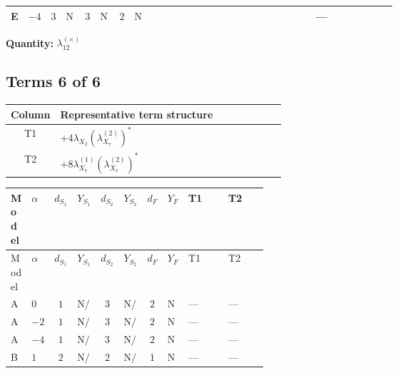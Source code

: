 \documentclass[8pt]{article}
\begin{document}
\begin{landscape}
\begin{longtable}{@{}llcccccc >{\raggedright\arraybackslash}p{0.21\linewidth} >{\raggedright\arraybackslash}p{0.21\linewidth} >{\raggedright\arraybackslash}p{0.21\linewidth}@{}}
\midrule
E & $-4$ & $3$ & $\text{N/A}$ & $3$ & $\text{N/A}$ & $2$ & $\text{N/A}$ & \scriptsize\adjustbox{max width=\linewidth}{$\begin{gathered} +2 {\lambda_{12}^{(\times)}} {\lambda_{S_2}^{(1)}}\end{gathered}$} & \scriptsize\adjustbox{max width=\linewidth}{$\begin{gathered} -2 {\lambda_{12}^{(\times)}} {\lambda_{S_2}^{(A)}}\end{gathered}$} & --- \\
\midrule
\bottomrule
\end{longtable}
\clearpage
\noindent\textbf{Quantity: }$\lambda_{12}^{(\times)}$\par\smallskip
\subsection*{Terms 6 of 6}
\begin{center}
\begin{tabular}{@{}c >{\raggedright\arraybackslash}p{0.82\linewidth}@{}}
\toprule
Column & Representative term structure \\
\midrule
T1 & \(\displaystyle +4 {\lambda_{X_{2}}} \left({\lambda_{X_{7}}^{(2)}}\right)^{*}\) \\
\midrule
T2 & \(\displaystyle +8 {\lambda_{X_{7}}^{(1)}} \left({\lambda_{X_{7}}^{(2)}}\right)^{*}\) \\
\midrule
\bottomrule
\end{tabular}
\end{center}
\smallskip
\tiny
\begin{longtable}{@{}llcccccc >{\raggedright\arraybackslash}p{0.21\linewidth} >{\raggedright\arraybackslash}p{0.21\linewidth}@{}}
\toprule
Model & $\alpha$ & $d_{S_1}$ & $Y_{S_1}$ & $d_{S_2}$ & $Y_{S_2}$ & $d_F$ & $Y_F$ & T1 & T2 \\
\midrule
\endfirsthead
\toprule
Model & $\alpha$ & $d_{S_1}$ & $Y_{S_1}$ & $d_{S_2}$ & $Y_{S_2}$ & $d_F$ & $Y_F$ & T1 & T2 \\
\midrule
\endhead
A & $0$ & $1$ & $\text{N/A}$ & $3$ & $\text{N/A}$ & $2$ & $\text{N/A}$ & --- & --- \\
\midrule
A & $-2$ & $1$ & $\text{N/A}$ & $3$ & $\text{N/A}$ & $2$ & $\text{N/A}$ & --- & --- \\
\midrule
A & $-4$ & $1$ & $\text{N/A}$ & $3$ & $\text{N/A}$ & $2$ & $\text{N/A}$ & --- & --- \\
\midrule
B & $1$ & $2$ & $\text{N/A}$ & $2$ & $\text{N/A}$ & $1$ & $\text{N/A}$ & --- & --- \\

\end{longtable}
\end{landscape}
\end{document}
